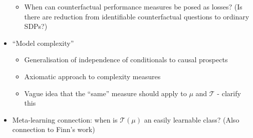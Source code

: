 \begin{itemize}
\begin{itemize}
        \item When can counterfactual performance measures be posed as losses? (Is there are reduction from identifiable counterfactual questions to ordinary SDPs?)
    \end{itemize}
    \item ``Model complexity''
    \begin{itemize}
        \item Generalisation of independence of conditionals to causal prospects
        \item Axiomatic approach to complexity measures
        \item Vague idea that the ``same'' measure should apply to $\mu$ and $\mathscr{T}$ - clarify this
    \end{itemize}
    \item Meta-learning connection: when is $\mathscr{T}(\mu)$ an easily learnable class? (Also connection to Finn's work)
\end{itemize}